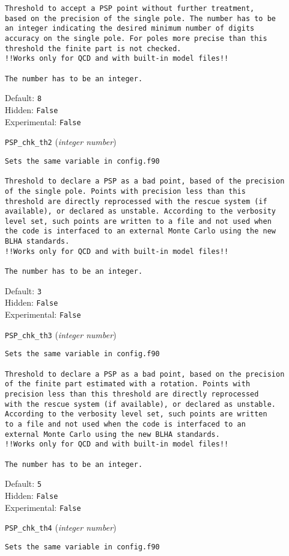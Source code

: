 \begin{basedescript}{\desclabelstyle{\pushlabel}}
\begin{verbatim}
Threshold to accept a PSP point without further treatment,
based on the precision of the single pole. The number has to be
an integer indicating the desired minimum number of digits
accuracy on the single pole. For poles more precise than this
threshold the finite part is not checked.
!!Works only for QCD and with built-in model files!!

The number has to be an integer.
\end{verbatim}
Default: \verb|8|
\\Hidden: \verb|False|
\\Experimental: \verb|False|
\\\item[\colorbox{gray!30}{\texttt{PSP\_chk\_th2}}] (\textit{integer number})
\begin{verbatim}
Sets the same variable in config.f90

Threshold to declare a PSP as a bad point, based of the precision
of the single pole. Points with precision less than this
threshold are directly reprocessed with the rescue system (if
available), or declared as unstable. According to the verbosity
level set, such points are written to a file and not used when
the code is interfaced to an external Monte Carlo using the new
BLHA standards.
!!Works only for QCD and with built-in model files!!

The number has to be an integer.
\end{verbatim}
Default: \verb|3|
\\Hidden: \verb|False|
\\Experimental: \verb|False|
\\\item[\colorbox{gray!30}{\texttt{PSP\_chk\_th3}}] (\textit{integer number})
\begin{verbatim}
Sets the same variable in config.f90

Threshold to declare a PSP as a bad point, based on the precision
of the finite part estimated with a rotation. Points with
precision less than this threshold are directly reprocessed
with the rescue system (if available), or declared as unstable.
According to the verbosity level set, such points are written
to a file and not used when the code is interfaced to an
external Monte Carlo using the new BLHA standards.
!!Works only for QCD and with built-in model files!!

The number has to be an integer.
\end{verbatim}
Default: \verb|5|
\\Hidden: \verb|False|
\\Experimental: \verb|False|
\\\item[\colorbox{gray!30}{\texttt{PSP\_chk\_th4}}] (\textit{integer number})
\begin{verbatim}
Sets the same variable in config.f90


\end{verbatim}
\end{basedescript}

